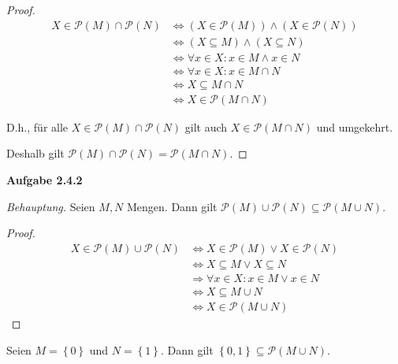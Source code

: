 \documentclass[12pt]{extarticle}
\begin{document}
\begin{proof}
\begin{align*}
  X \in \mathcal{P}(M) \cap \mathcal{P}(N)
  &\iff (X \in \mathcal{P}(M)) \wedge (X \in \mathcal{P}(N))
  \tag*{Definition von Durchschnitt}\\
  &\iff (X \subseteq M) \wedge (X \subseteq N)
    \tag*{Definition von Potenzmenge}\\
  &\iff \forall x \in X: x \in M \wedge x \in N
    \tag*{Definition von Teilmenge}\\
  &\iff \forall x \in X: x \in M \cap N
  \tag*{Definition von Durchschnitt}\\
  &\iff X \subseteq M \cap N
    \tag*{Definition von Teilmenge}\\
  &\iff X \in \mathcal{P}(M \cap N)
    \tag*{Definition von Potenzmenge}
\end{align*}

D.h., für alle \(X \in \mathcal{P}(M) \cap \mathcal{P}(N)\) gilt auch
\(X \in \mathcal{P}(M \cap N)\) und umgekehrt.

Deshalb gilt
\(\mathcal{P}(M) \cap \mathcal{P}(N) = \mathcal{P}(M\cap N)\).
  \end{proof}

\textbf{Aufgabe 2.4.2}

\textit{Behauptung.}  Seien \(M, N\) Mengen.  Dann gilt $\mathcal{P}(M)
\cup \mathcal{P}(N) \subseteq \mathcal{P}(M \cup N)$.

\begin{proof}

\begin{align*}
  X \in \mathcal{P}(M) \cup \mathcal{P}(N)
  &\Leftrightarrow X \in \mathcal{P}(M) \lor X \in \mathcal{P}(N)
    \tag*{Definition von Vereinigung}\\
  &\Leftrightarrow X \subseteq M \lor X \subseteq N
    \tag*{Definition von Potenzmengen}\\
  &\Rightarrow \forall x \in X: x \in M \lor x \in N
    \tag*{Definition von Teilmengen}\\
  &\Leftrightarrow X \subseteq M \cup N
    \tag*{Definition von Vereinigung}\\
  &\Leftrightarrow X \in \mathcal{P}(M \cup N)
    \tag*{Definition von Potenzmengen}
\end{align*}
  \end{proof}

  Seien \(M= \left\{ 0 \right\}\) und \(N= \left\{ 1 \right\}\).  Dann
  gilt \(\left\{ 0,1 \right\} \subseteq \mathcal{P}(M \cup N)\).
\end{document}
